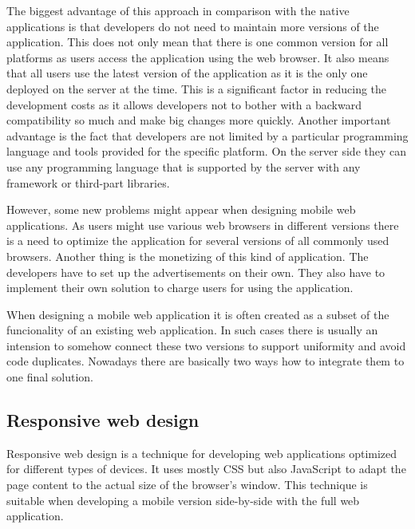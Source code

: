 \documentclass[12pt,oneside,final]{fithesis2}
\begin{document}
The biggest advantage of this approach in comparison with the native applications is that developers do not need to maintain more versions of the application.
This does not only mean that there is one common version for all platforms as users access the application using the web browser.
It also means that all users use the latest version of the application as it is the only one deployed on the server at the time.
This is a significant factor in reducing the development costs as it allows developers not to bother with a backward compatibility so much and make big changes more quickly.
Another important advantage is the fact that developers are not limited by a particular programming language and tools provided for the specific platform.
On the server side they can use any programming language that is supported by the server with any framework or third-part libraries.

However, some new problems might appear when designing mobile web applications.
As users might use various web browsers in different versions there is a need to optimize the application for several versions of all commonly used browsers.
Another thing is the monetizing of this kind of application.
The developers have to set up the advertisements on their own.
They also have to implement their own solution to charge users for using the application.

When designing a mobile web application it is often created as a subset of the funcionality of an existing web application.
In such cases there is usually an intension to somehow connect these two versions to support uniformity and avoid code duplicates.
Nowadays there are basically two ways how to integrate them to one final solution.

\subsection{Responsive web design}
Responsive web design is a technique for developing web applications optimized for different types of devices.
It uses mostly CSS but also JavaScript to adapt the page content to the actual size of the browser's window. \cite{marcotte11}
This technique is suitable when developing a mobile version side-by-side with the full web application.
\end{document}
